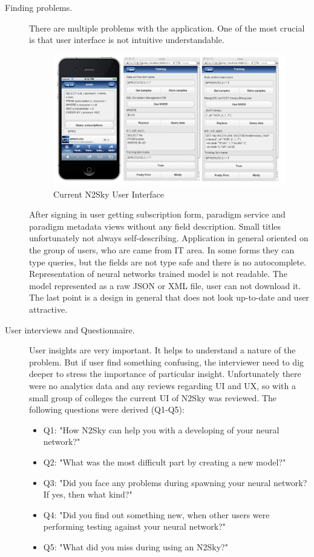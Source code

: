\begin{description}

\item[Finding problems.]  There are multiple problems with the application. One of the most crucial is that user interface is not intuitive understandable. 
\begin{figure}[htbp]
\begin{center}
  \includegraphics[width=\linewidth]{components/2/old_arch.png}
  \caption{Current N2Sky User Interface}
  \label{fig:old_arch}
\end{center}
\end{figure}


After signing in user getting subscription form, paradigm service and paradigm metadata views without any field description. Small titles unfortunately not always self-describing. Application in general oriented on the group of users, who are came from IT area. In some forms they can type queries, but the fields are not type safe and there is no autocomplete.
Representation of neural networks trained model is not readable. The model represented as a raw JSON or XML file, user can not download it. The last point is a design in general that does not look up-to-date and user attractive. 


\item[User interviews and Questionnaire.]
User insights are very important. It helps to understand a nature of the problem. But if user find something confusing, the interviewer need to dig deeper to stress the importance of particular insight. Unfortunately there were no analytics data and any reviews regarding UI and UX, so with a small group of colleges the current UI of N2Sky was reviewed. 
The following questions were derived (Q1-Q5): 


\begin{itemize}
\item Q1: "How N2Sky can help you with a developing of your neural network?"
\item Q2: "What was the most difficult part by creating a new model?"
\item Q3: "Did you face any problems during spawning your neural network? If yes, then what kind?"
\item Q4: "Did you find out something new, when other users were performing testing against your neural network?"
\item Q5: "What did you miss during using an N2Sky?"
\end{itemize}	


\end{description}
